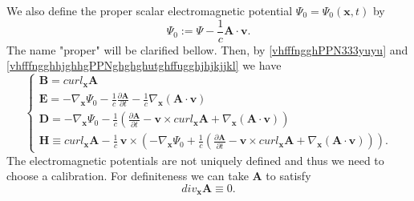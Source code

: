 \documentclass{article}
\theoremstyle{definition}
\theoremstyle{remark}
\renewcommand{\vec}[1]{\mathbf{#1}}
\newcommand{\er}{\eqref}
\newcommand{\er}{\eqref}
\begin{document}
We also define the proper scalar electromagnetic potential
$\Psi_0=\Psi_0(\vec x,t)$ by
\begin{equation}\label{vhfffngghhjghhgPPNghghghutghffugghjhjkjjkl}
\Psi_0:=\Psi-\frac{1}{c}\vec A\cdot\vec v.
\end{equation}
The name "proper" will be clarified bellow. Then, by
\er{vhfffngghPPN333yuyu} and
\er{vhfffngghhjghhgPPNghghghutghffugghjhjkjjkl} we have
\begin{equation}\label{vhfffngghPPN}
\begin{cases}
\vec B= curl_{\vec x} \vec A\\
\vec E=-\nabla_{\vec x}\Psi_0-\frac{1}{c}\frac{\partial\vec
A}{\partial t}-\frac{1}{c}\nabla_{\vec x}\left(\vec A\cdot\vec
v\right)
\\
 \vec D=-\nabla_{\vec
x}\Psi_0-\frac{1}{c}\left(\frac{\partial\vec A}{\partial t}-\vec
v\times curl_{\vec x}\vec A+\nabla_{\vec x}\left(\vec A\cdot\vec
v\right)\right)
\\
\vec H\equiv curl_{\vec x} \vec A-\frac{1}{c}\,\vec v\times
\left(-\nabla_{\vec x}\Psi_0+\frac{1}{c}\left(\frac{\partial\vec
A}{\partial t}-\vec v\times curl_{\vec x}\vec A+\nabla_{\vec
x}\left(\vec A\cdot\vec v\right)\right)\right).
\end{cases}
\end{equation}
The electromagnetic potentials are not uniquely defined and thus we
need to choose a calibration. For definiteness we can take $\vec A$
to satisfy
\begin{equation}\label{MaxVacFull1bjkgjhjhgjgjgkjfhjfdghghligioiuittrPPN22}
div_{\vec x}\vec A\equiv 0.
\end{equation}
%
%
%
\begin{comment}
It is clear that if $(\tilde\Psi,\tilde{\vec A})$ is another choice
of electromagnetic potentials with a different calibration then
there exists a scalar field $w:=w(\vec x,t)$ such that
\begin{equation}\label{MaxVacFull1bjkgjhjhgjgjgkjfhjfdghghligioiuittrPPNhjkjhkj}
\begin{cases}
\tilde\Psi=\Psi+\frac{\partial w}{\partial t}\\
\tilde{\vec A}=\vec A-\nabla_{\vec x}w,
\end{cases}
\end{equation}
\end{comment}
\end{document}
